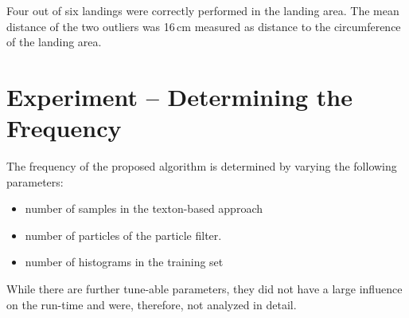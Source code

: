 \documentclass[11pt]{report}
\begin{document}


Four out of six landings were correctly performed in the landing
area. The mean distance of the two outliers was 16\,cm measured as
distance to the circumference of the landing area.
%

\section{Experiment -- Determining the Frequency}

The frequency of the proposed algorithm is determined by varying the
following parameters:
\begin{itemize}
\item number of samples in the texton-based approach
\item number of particles of the particle filter.
\item number of histograms in the training set
\end{itemize}

While there are further tune-able parameters, they did not have a
large influence on the run-time and were, therefore, not analyzed in
detail.
\end{document}

